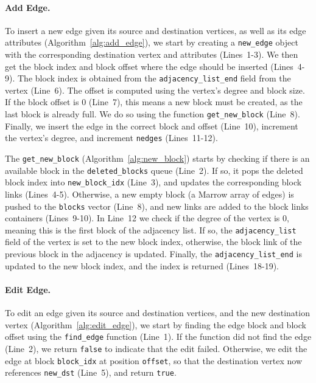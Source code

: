 


\paragraph{\textbf{Add Edge}.} To insert a new edge given its source and destination vertices, as well as its edge attributes (Algorithm~\ref{alg:add_edge}), we start by creating a \texttt{new\_edge} object with the corresponding destination vertex and attributes (Lines~1-3). We then get the block index and block offset where the edge should be inserted (Lines~4-9). The block index is obtained from the \texttt{adjacency\_list\_end} field from the vertex (Line~6). The offset is computed using the vertex's degree and block size. If the block offset is 0 (Line~7), this means a new block must be created, as the last block is already full. We do so using the function \texttt{get\_new\_block} (Line~8). Finally, we insert the edge in the correct block and offset (Line~10), increment the vertex's degree, and increment \texttt{nedges} (Lines~11-12). 



The \texttt{get\_new\_block} (Algorithm~\ref{alg:new_block}) starts by checking if there is an available block in the \texttt{deleted\_blocks} queue (Line~2). If so, it pops the deleted block index into \texttt{new\_block\_idx} (Line~3), and updates the corresponding block links (Lines~4-5). Otherwise, a new empty block (a Marrow array of edges) is pushed to the \texttt{blocks} vector (Line~8), and new links are added to the block links containers (Lines~9-10). In Line~12 we check if the degree of the vertex is 0, meaning this is the first block of the adjacency list. If so, the \texttt{adjacency\_list} field of the vertex is set to the new block index, otherwise, the block link of the previous block in the adjacency is updated. Finally, the \texttt{adjacency\_list\_end} is updated to the new block index, and the index is returned (Lines~18-19).




\paragraph{\textbf{Edit Edge}.} To edit an edge given its source and destination vertices, and the new destination vertex (Algorithm~\ref{alg:edit_edge}), we start by finding the edge block and block offset using the \texttt{find\_edge} function (Line~1). If the function did not find the edge (Line~2), we return \texttt{false} to indicate that the edit failed. Otherwise, we edit the edge at block \texttt{block\_idx} at position \texttt{offset}, so that the destination vertex now references \texttt{new\_dst}  (Line~5), and return \texttt{true}. 
 

